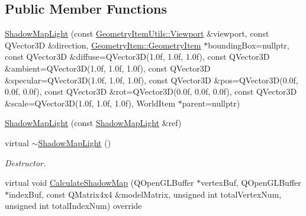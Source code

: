 \subsection*{Public Member Functions}
\begin{DoxyCompactItemize}
\item 
\mbox{\hyperlink{class_geometry_engine_1_1_geometry_world_item_1_1_geometry_light_1_1_shadow_map_light_adea3c877b7843389e52c351e5e4d5a75}{Shadow\+Map\+Light}} (const \mbox{\hyperlink{class_geometry_engine_1_1_geometry_item_utils_1_1_viewport}{Geometry\+Item\+Utils\+::\+Viewport}} \&viewport, const Q\+Vector3D \&direction, \mbox{\hyperlink{class_geometry_engine_1_1_geometry_world_item_1_1_geometry_item_1_1_geometry_item}{Geometry\+Item\+::\+Geometry\+Item}} $\ast$bounding\+Box=nullptr, const Q\+Vector3D \&diffuse=Q\+Vector3D(1.\+0f, 1.\+0f, 1.\+0f), const Q\+Vector3\+D \&ambient=\+Q\+Vector3\+D(1.\+0f, 1.\+0f, 1.\+0f), const Q\+Vector3\+D \&specular=\+Q\+Vector3\+D(1.\+0f, 1.\+0f, 1.\+0f), const Q\+Vector3\+D \&pos=\+Q\+Vector3\+D(0.\+0f, 0.\+0f, 0.\+0f), const Q\+Vector3\+D \&rot=\+Q\+Vector3\+D(0.\+0f, 0.\+0f, 0.\+0f), const Q\+Vector3\+D \&scale=\+Q\+Vector3\+D(1.\+0f, 1.\+0f, 1.\+0f), World\+Item $\ast$parent=nullptr)
\item 
\mbox{\hyperlink{class_geometry_engine_1_1_geometry_world_item_1_1_geometry_light_1_1_shadow_map_light_a2879b30ef1f4ff318fd55f600001f70f}{Shadow\+Map\+Light}} (const \mbox{\hyperlink{class_geometry_engine_1_1_geometry_world_item_1_1_geometry_light_1_1_shadow_map_light}{Shadow\+Map\+Light}} \&ref)
\item 
\mbox{\label{class_geometry_engine_1_1_geometry_world_item_1_1_geometry_light_1_1_shadow_map_light_a1156dcba4ae7c3f9dce061ef9c0b2e7a}} 
virtual \mbox{\hyperlink{class_geometry_engine_1_1_geometry_world_item_1_1_geometry_light_1_1_shadow_map_light_a1156dcba4ae7c3f9dce061ef9c0b2e7a}{$\sim$\+Shadow\+Map\+Light}} ()
\begin{DoxyCompactList}\small\item\em Destructor. \end{DoxyCompactList}\item 
virtual void \mbox{\hyperlink{class_geometry_engine_1_1_geometry_world_item_1_1_geometry_light_1_1_shadow_map_light_a518efafd59e2dcd446140ae82140e172}{Calculate\+Shadow\+Map}} (Q\+Open\+G\+L\+Buffer $\ast$vertex\+Buf, Q\+Open\+G\+L\+Buffer $\ast$index\+Buf, const Q\+Matrix4x4 \&model\+Matrix, unsigned int total\+Vertex\+Num, unsigned int total\+Index\+Num) override

\end{DoxyCompactItemize}
